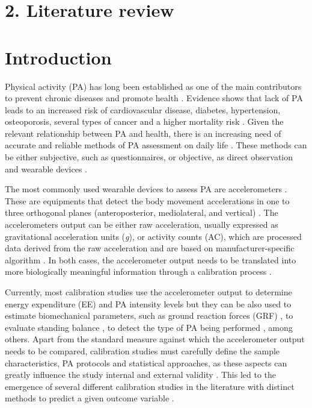 \documentclass[12pt]{article}
\def\blankpage{%
      \clearpage%
      \thispagestyle{empty}%
      \addtocounter{page}{+0}%
      \null%
      \clearpage}
\begin{document}
\pagebreak

\pagebreak


\section*{\vfill\raggedleft\bfseries 2. Literature review}
\thispagestyle{empty} 
\blankpage

\section*{Introduction}

Physical activity (PA) has long been established as one of the main contributors to prevent chronic diseases and promote health . Evidence shows that lack of PA leads to an increased risk of cardiovascular disease, diabetes, hypertension, osteoporosis, several types of cancer and a higher mortality risk . Given the relevant relationship between PA and health, there is an increasing need of accurate and reliable methods of PA assessment on daily life . These methods can be either subjective, such as questionnaires, or objective, as direct observation and wearable devices .

The most commonly used wearable devices to assess PA are accelerometers . These are equipments that detect the body movement accelerations in one to three orthogonal planes (anteroposterior, mediolateral, and vertical) . The accelerometers output can be either raw acceleration, usually expressed as gravitational acceleration units (\textit{g}), or activity counts (AC), which are processed data derived from the raw acceleration and are based on manufacturer-specific algorithm . In both cases, the accelerometer output needs to be translated into more biologically meaningful information through a calibration process .

Currently, most calibration studies use the accelerometer output to determine energy expenditure (EE) and PA intensity levels  but they can be also used to estimate biomechanical parameters, such as ground reaction forces (GRF) , to evaluate standing balance , to detect the type of PA being performed , among others. Apart from the standard measure against which the accelerometer output needs to be compared, calibration studies must carefully define the sample characteristics, PA protocols and statistical approaches, as these aspects can greatly influence the study internal and external validity . This led to the emergence of several different calibration studies in the literature with distinct methods to predict a given outcome variable .
\end{document}

